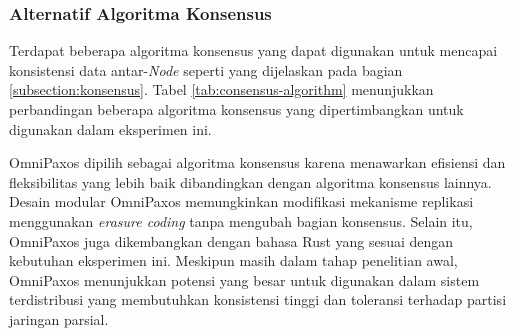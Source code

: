 \subsubsection{Alternatif Algoritma Konsensus}
\label{subsubsection:alternatif-algoritma-konsensus}

Terdapat beberapa algoritma konsensus yang dapat digunakan untuk mencapai konsistensi data antar-\textit{Node} seperti yang dijelaskan pada bagian \ref{subsection:konsensus}. Tabel \ref{tab:consensus-algorithm} menunjukkan perbandingan beberapa algoritma konsensus yang dipertimbangkan untuk digunakan dalam eksperimen ini.

\begin{table}[ht]
    \centering
    \caption{Perbandingan Algoritma Konsensus}
    \label{tab:consensus-algorithm}
\end{table}

OmniPaxos dipilih sebagai algoritma konsensus karena menawarkan efisiensi dan fleksibilitas yang lebih baik dibandingkan dengan algoritma konsensus lainnya. Desain modular OmniPaxos memungkinkan modifikasi mekanisme replikasi menggunakan \textit{erasure coding} tanpa mengubah bagian konsensus. Selain itu, OmniPaxos juga dikembangkan dengan bahasa Rust yang sesuai dengan kebutuhan eksperimen ini. Meskipun masih dalam tahap penelitian awal, OmniPaxos menunjukkan potensi yang besar untuk digunakan dalam sistem terdistribusi yang membutuhkan konsistensi tinggi dan toleransi terhadap partisi jaringan parsial.